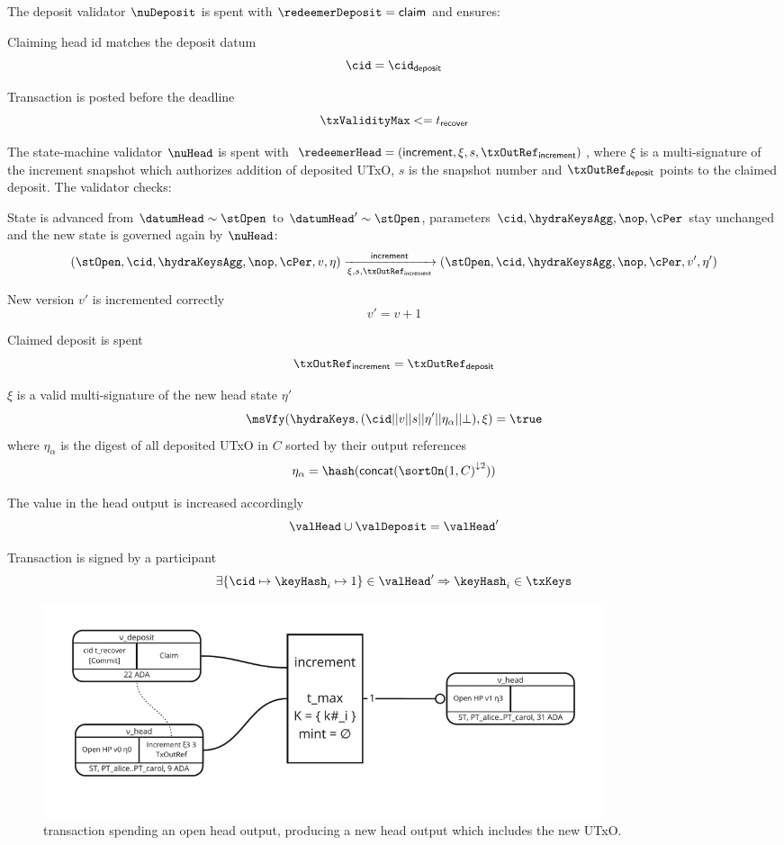 \noindent The deposit validator $\nuDeposit$ is spent with
$\redeemerDeposit = \mathsf{claim}$ and ensures:
\begin{menumerate}
  \item Claiming head id matches the deposit datum
  \[
    \cid = \cid_{\mathsf{deposit}}
  \]
  \item Transaction is posted before the deadline
  \[
    \txValidityMax <= t_{\mathsf{recover}}
  \]
\end{menumerate}

\noindent The state-machine validator $\nuHead$ is spent with
$\redeemerHead = (\mathsf{increment}, \xi, s, \txOutRef_{\mathsf{increment}})$,
where $\xi$ is a multi-signature of the increment snapshot which authorizes
addition of deposited UTxO, $s$ is the snapshot number and
$\txOutRef_{\mathsf{deposit}}$ points to the claimed deposit. The validator
checks:
\begin{menumerate}
  \item State is advanced from $\datumHead \sim \stOpen$ to
  $\datumHead' \sim \stOpen$, parameters $\cid,\hydraKeysAgg,\nop,\cPer$
  stay unchanged and the new state is governed again by $\nuHead$:
  \[
	(\stOpen,\cid,\hydraKeysAgg,\nop,\cPer,v,\eta) \xrightarrow[\xi, s, \txOutRef_{\mathsf{increment}}]{\mathsf{increment}} (\stOpen,\cid,\hydraKeysAgg,\nop,\cPer,v',\eta')
  \]
  \item New version $v'$ is incremented correctly
  \[
	v' = v + 1
  \]
  \item Claimed deposit is spent
  \[
    \txOutRef_{\mathsf{increment}} = \txOutRef_{\mathsf{deposit}}
  \]
  \item $\xi$ is a valid multi-signature of the new head state $\eta'$
  \[
	\msVfy(\hydraKeys,(\cid || v || s || \eta' || \eta_\alpha || \bot),\xi) = \true
  \]
  where $\eta_\alpha$ is the digest of all deposited UTxO in $C$ sorted by their output
  references
  \[
	\eta_\alpha = \hash(\mathsf{concat}({\sortOn(1, C)}^{\downarrow2}))
  \]
  \item The value in the head output is increased accordingly
  \[
	\valHead \cup \valDeposit = \valHead'
  \]
  \item Transaction is signed by a participant
  \[
	\exists \{\cid \mapsto \keyHash_{i} \mapsto 1\} \in \valHead' \Rightarrow \keyHash_{i} \in \txKeys
  \]
\end{menumerate}


\begin{figure}
  \centering
  \includegraphics[width=0.8\textwidth]{Hydra/Protocol/Figures/incrementTx.pdf}
  \caption{\mtxIncrement{} transaction spending an open head output,
	producing a new head output which includes the new UTxO.}\label{fig:incrementTx}
\end{figure}

